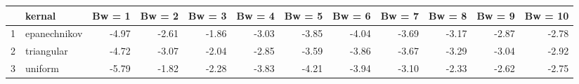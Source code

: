 \begin{tabular}{rlrrrrrrrrrr}
  \hline
 & kernal & Bw = 1 & Bw = 2 & Bw = 3 & Bw = 4 & Bw = 5 & Bw = 6 & Bw = 7 & Bw = 8 & Bw = 9 & Bw = 10 \\ 
  \hline
1 & epanechnikov & -4.97 & -2.61 & -1.86 & -3.03 & -3.85 & -4.04 & -3.69 & -3.17 & -2.87 & -2.78 \\ 
  2 & triangular & -4.72 & -3.07 & -2.04 & -2.85 & -3.59 & -3.86 & -3.67 & -3.29 & -3.04 & -2.92 \\ 
  3 & uniform & -5.79 & -1.82 & -2.28 & -3.83 & -4.21 & -3.94 & -3.10 & -2.33 & -2.62 & -2.75 \\ 
   \hline
\end{tabular}
